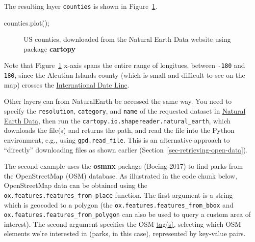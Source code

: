 \documentclass[
  letterpaper,
]{krantz}
\newenvironment{Shaded}{\begin{snugshade}}{\end{snugshade}}
\newcommand{\NormalTok}[1]{\textcolor[rgb]{0.00,0.23,0.31}{#1}}
\newcommand{\OperatorTok}[1]{\textcolor[rgb]{0.37,0.37,0.37}{#1}}
\begin{document}
The resulting layer \texttt{counties} is shown in
Figure~\ref{fig-ne-counties}.

\begin{Shaded}
\begin{Highlighting}[]
\NormalTok{counties.plot()}\OperatorTok{;}
\end{Highlighting}
\end{Shaded}

\begin{figure}[H]


\caption{\label{fig-ne-counties}US counties, downloaded from the Natural
Earth Data website using package \textbf{cartopy}}

\end{figure}%

Note that Figure~\ref{fig-ne-counties} x-axis spans the entire range of
longitues, between \texttt{-180} and \texttt{180}, since the Aleutian
Islands county (which is small and difficult to see on the map) crosses
the
\href{https://en.wikipedia.org/wiki/International_Date_Line}{International
Date Line}.

Other layers can from NaturalEarth be accessed the same way. You need to
specify the \texttt{resolution}, \texttt{category}, and \texttt{name} of
the requested dataset in
\href{https://www.naturalearthdata.com/downloads/}{Natural Earth Data},
then run the \texttt{cartopy.io.shapereader.natural\_earth}, which
downloads the file(s) and returns the path, and read the file into the
Python environment, e.g., using \texttt{gpd.read\_file}. This is an
alternative approach to ``directly'' downloading files as shown earlier
(Section~\ref{sec-retrieving-open-data}).

The second example uses the \textbf{osmnx} package (Boeing 2017) to find
parks from the OpenStreetMap (OSM) database. As illustrated in the code
chunk below, OpenStreetMap data can be obtained using the
\texttt{ox.features.features\_from\_place} function. The first argument
is a string which is geocoded to a polygon (the
\texttt{ox.features.features\_from\_bbox} and
\texttt{ox.features.features\_from\_polygon} can also be used to query a
custom area of interest). The second argument specifies the OSM
\href{https://wiki.openstreetmap.org/wiki/Map_features}{tag(s)},
selecting which OSM elements we're interested in (parks, in this case),
represented by key-value pairs.
\end{document}
